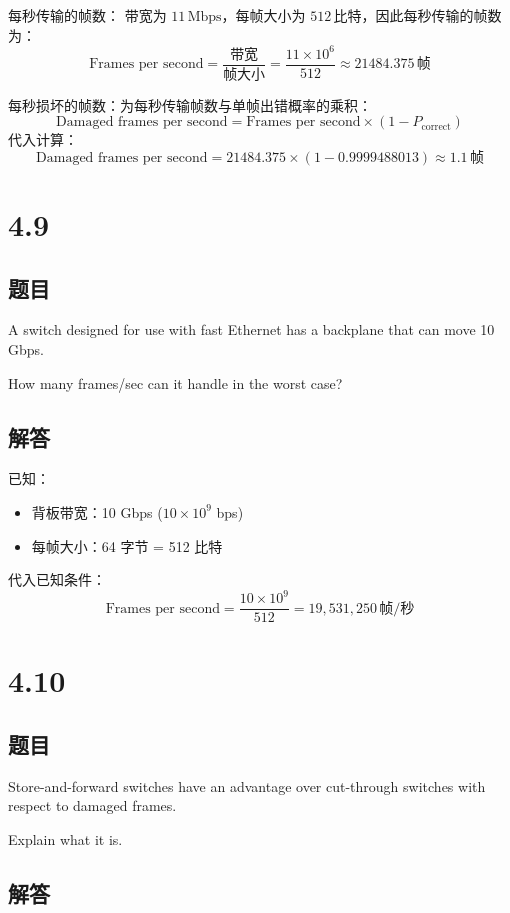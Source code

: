 每秒传输的帧数：
   带宽为 \(11 \, \text{Mbps}\)，每帧大小为 \(512 \, \text{比特}\)，因此每秒传输的帧数为：  
   \[
   \text{Frames per second} = \frac{\text{带宽}}{\text{帧大小}} = \frac{11 \times 10^6}{512} \approx 21484.375 \, \text{帧}
   \]

每秒损坏的帧数：为每秒传输帧数与单帧出错概率的乘积：  
   \[
   \text{Damaged frames per second} = \text{Frames per second} \times (1 - P_{\text{correct}})
   \]
   代入计算：
   \[
   \text{Damaged frames per second} = 21484.375 \times (1 - 0.9999488013) \approx 1.1 \, \text{帧}
   \]

\section{4.9}

\subsection*{题目}
A switch designed for use with fast Ethernet has a backplane that can move 10 Gbps.

How many frames/sec can it handle in the worst case?

\subsection*{解答}

已知：
\begin{itemize}
    \item 背板带宽：10 Gbps (\(10 \times 10^9\) bps)
    \item 每帧大小：64 字节 = 512 比特
\end{itemize}

代入已知条件：
\[
\text{Frames per second} = \frac{10 \times 10^9}{512} = 19,531,250 \, \text{帧/秒}
\]


\section{4.10}

\subsection*{题目}
Store-and-forward switches have an advantage over cut-through switches with respect to damaged frames.

Explain what it is.

\subsection*{解答}

